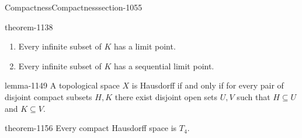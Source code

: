 \documentclass[oneside,10pt,]{article}
\begin{document}
\begin{sectionptx}{Compactness}{}{Compactness}{}{}{section-1055}
\begin{theorem}{}{}{theorem-1138}
\begin{enumerate}
\item\hypertarget{li-1145}{}Every infinite subset of \(K\) has a limit point.%
\item\hypertarget{li-1147}{}Every infinite subset of \(K\) has a sequential limit point.%
\end{enumerate}
\end{theorem}
\begin{lemma}{}{}{lemma-1149}%
\hypertarget{p-1150}{}%
A topological space \(X\) is Hausdorff if and only if for every pair of disjoint compact subsets \(H,K\) there exist disjoint open sets \(U,V\) such that \(H\subseteq U\) and \(K\subseteq V\).%
\end{lemma}
\begin{theorem}{}{}{theorem-1156}%
\hypertarget{p-1157}{}%
Every compact Hausdorff space is \(T_4\).%
\end{theorem}
\end{sectionptx}
%
%
\typeout{************************************************}
\typeout{************************************************}
%
\end{document}
